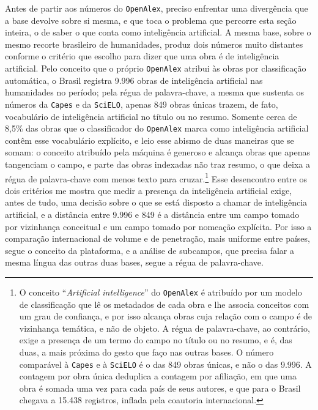 Antes de partir aos números do \texttt{OpenAlex}, preciso enfrentar uma divergência que a base devolve sobre si mesma, e que toca o problema que percorre esta seção inteira, o de saber o que conta como inteligência artificial. A mesma base, sobre o mesmo recorte brasileiro de humanidades, produz dois números muito distantes conforme o critério que escolho para dizer que uma obra é de inteligência artificial. Pelo conceito que o próprio \texttt{OpenAlex} atribui às obras por classificação automática, o Brasil registra 9.996 obras de inteligência artificial nas humanidades no período; pela régua de palavra-chave, a mesma que sustenta os números da \texttt{Capes} e da \texttt{SciELO}, apenas 849 obras únicas trazem, de fato, vocabulário de inteligência artificial no título ou no resumo. Somente cerca de 8,5\% das obras que o classificador do \texttt{OpenAlex} marca como inteligência artificial contêm esse vocabulário explícito, e leio esse abismo de duas maneiras que se somam: o conceito atribuído pela máquina é generoso e alcança obras que apenas tangenciam o campo, e parte das obras indexadas não traz resumo, o que deixa a régua de palavra-chave com menos texto para cruzar.\footnote{O conceito \enquote{\emph{Artificial intelligence}} do \texttt{OpenAlex} é atribuído por um modelo de classificação que lê os metadados de cada obra e lhe associa conceitos com um grau de confiança, e por isso alcança obras cuja relação com o campo é de vizinhança temática, e não de objeto. A régua de palavra-chave, ao contrário, exige a presença de um termo do campo no título ou no resumo, e é, das duas, a mais próxima do gesto que faço nas outras bases. O número comparável à \texttt{Capes} e à \texttt{SciELO} é o das 849 obras únicas, e não o das 9.996. A contagem por obra única deduplica a contagem por afiliação, em que uma obra é somada uma vez para cada país de seus autores, e que para o Brasil chegava a 15.438 registros, inflada pela coautoria internacional.} Esse desencontro entre os dois critérios me mostra que medir a presença da inteligência artificial exige, antes de tudo, uma decisão sobre o que se está disposto a chamar de inteligência artificial, e a distância entre 9.996 e 849 é a distância entre um campo tomado por vizinhança conceitual e um campo tomado por nomeação explícita. Por isso a comparação internacional de volume e de penetração, mais uniforme entre países, segue o conceito da plataforma, e a análise de subcampos, que precisa falar a mesma língua das outras duas bases, segue a régua de palavra-chave.

